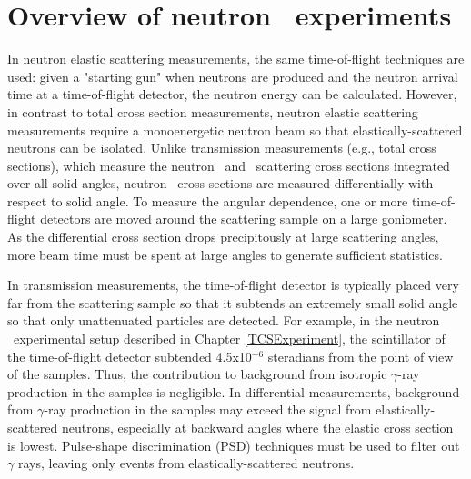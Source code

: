 \section{Overview of neutron \el\ experiments}
In neutron elastic scattering measurements, the same time-of-flight techniques are used:
given a "starting gun" when neutrons are produced and the neutron arrival time
at a time-of-flight detector, the neutron energy can be calculated.
However, in contrast to total cross section measurements, neutron elastic scattering
measurements require a monoenergetic neutron beam so that elastically-scattered
neutrons can be isolated. Unlike transmission measurements (e.g., total cross
sections), which measure the neutron \el\ and \rxn\ scattering cross sections integrated
over all solid angles, neutron \el\ cross sections are measured differentially with respect to 
solid angle. To measure the angular dependence, one or more time-of-flight detectors
are moved around the scattering sample on a large goniometer. As the differential cross section 
drops precipitously at large scattering angles, more beam time must be spent at
large angles to generate sufficient statistics.

In transmission measurements, the time-of-flight detector is typically placed
very far from the scattering sample so that it subtends an extremely small solid
angle so that only unattenuated particles are detected.
For example, in the neutron \tot\ experimental setup described in Chapter
\ref{TCSExperiment}, the scintillator of the time-of-flight detector subtended
4.5x10$^{-6}$ steradians from the point of view of the samples. Thus, the
contribution to background from isotropic $\gamma$-ray production in the samples is negligible.
In differential measurements,
background from $\gamma$-ray production in the samples may exceed the signal
from elastically-scattered neutrons, especially at backward angles where the elastic
cross section is lowest. Pulse-shape discrimination (PSD) techniques must be used to filter out 
$\gamma$ rays, leaving only events from elastically-scattered neutrons.

